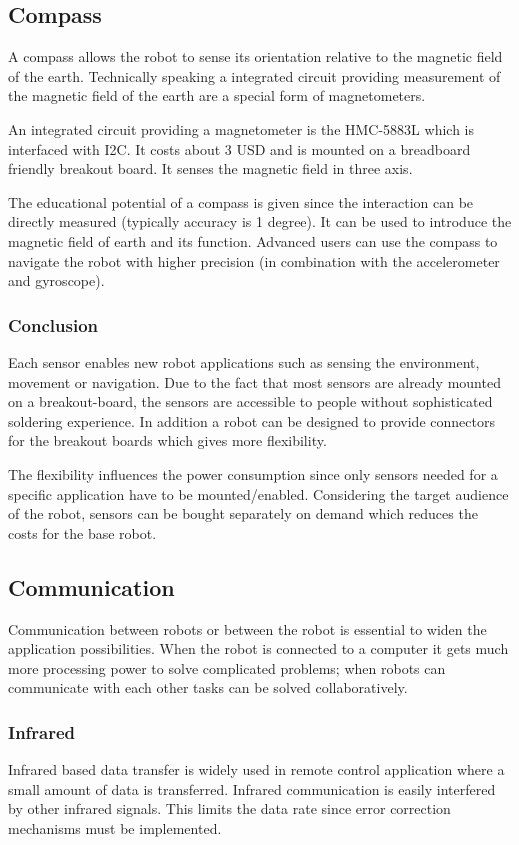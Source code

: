 \documentclass[11pt,a4paper]{article}
\begin{document}
\subsection{Compass}
A compass allows the robot to sense its orientation relative to the magnetic field of the earth. Technically speaking a integrated circuit providing measurement of the magnetic field of the earth are a special form of magnetometers.

An integrated circuit providing a magnetometer is the HMC-5883L which is interfaced with I2C. It costs about 3 USD and is mounted on a breadboard friendly breakout board. It senses the magnetic field in three axis.

The educational potential of a compass is given since the interaction can be directly measured (typically accuracy is 1 degree). It can be used to introduce the magnetic field of earth and its function. Advanced users can use the compass to navigate the robot with higher precision (in combination with the accelerometer and gyroscope).
\subsubsection{Conclusion}
Each sensor enables new robot applications such as sensing the environment, movement or navigation. Due to the fact that most sensors are already mounted on a breakout-board, the sensors are accessible to people without sophisticated soldering experience. In addition a robot can be designed to provide connectors for the breakout boards which gives more flexibility.

The flexibility influences the power consumption since only sensors needed for a specific application have to be mounted/enabled. Considering the target audience of the robot, sensors can be bought separately on demand which reduces the costs for the base robot.
\subsection{Communication}
Communication between robots or between the robot is essential to widen the application possibilities. When the robot is connected to a computer it gets much more processing power to solve complicated problems; when robots can communicate with each other tasks can be solved collaboratively.

\subsubsection{Infrared}
Infrared based data transfer is widely used in remote control application where a small amount of data is transferred. Infrared communication is easily interfered by other infrared signals. This limits the data rate since error correction mechanisms must be implemented.
\end{document}
